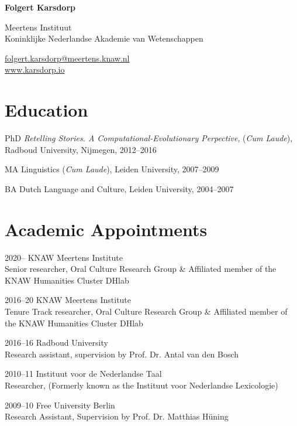\documentclass[12pt,letterpaper]{report}
\newcommand{\myname}{Folgert Karsdorp}
\newcommand{\namefont}[1]{{\normalfont\bfseries\Huge{#1}}}
\begin{document}
    \raggedright{}

    \namefont{\myname}

    \vspace{1em}
    \begin{minipage}[t]{0.600\textwidth}
        Meertens Instituut \\
        Koninklijke Nederlandse Akademie van Wetenschappen
    \end{minipage}
    \begin{minipage}[t]{0.390\textwidth}
        \flushright{}
        \href{mailto:folgert.karsdorp@meertens.knaw.nl}{folgert.karsdorp@meertens.knaw.nl} \\
        \href{https://www.karsdorp.io}{www.karsdorp.io}
    \end{minipage}

\section*{Education}
\begin{tablist}
\item[PhD] \tab{}\textit{Retelling Stories. A Computational-Evolutionary Perpective},
  (\textit{Cum Laude}), Radboud University, Nijmegen, 2012--2016
  \item[MA] \tab{}Linguistics (\textit{Cum Laude}), Leiden University, 2007--2009
  \item[BA]  \tab{}Dutch Language and Culture, Leiden University, 2004--2007
\end{tablist}


\section*{Academic Appointments}
\begin{tablist}
\item[2020--]   \tab{}KNAW Meertens Institute \\
  Senior researcher, Oral Culture Research Group \& Affiliated member of the KNAW Humanities
  Cluster DHlab

\item[2016--20] \tab{}KNAW Meertens Institute \\
  Tenure Track researcher, Oral Culture Research Group \& Affiliated member of the KNAW
  Humanities Cluster DHlab

\item[2016--16] \tab{}Radboud University \\
  Research assistant, supervision by Prof. Dr. Antal van den Bosch

\item[2010--11] \tab{}Instituut voor de Nederlandse Taal \\
  Researcher, (Formerly known as the Instituut voor Nederlandse Lexicologie)

\item[2009--10] \tab{}Free University Berlin \\
  Research Assistant, Supervision by Prof. Dr. Matthias Hüning
\end{tablist}
\end{document}
